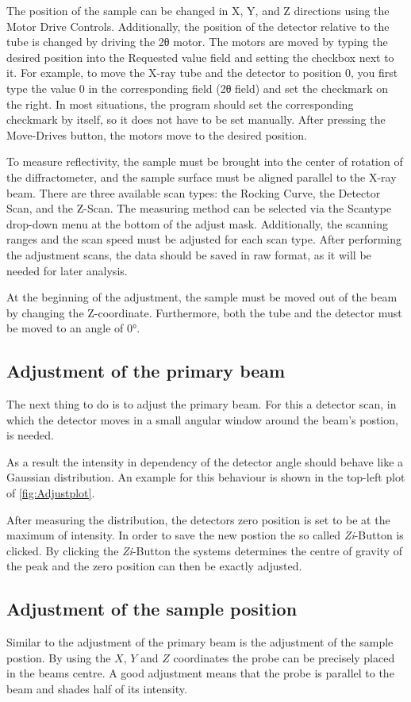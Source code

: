 The position of the sample can be changed in X, Y, and Z directions using the Motor Drive Controls. Additionally, the position of the detector relative to the tube is changed by driving the 2θ motor. The motors are moved by typing the desired position into the Requested value field and setting the checkbox next to it. For example, to move the X-ray tube and the detector to position 0, you first type the value 0 in the corresponding field (2θ field) and set the checkmark on the right. In most situations, the program should set the corresponding checkmark by itself, so it does not have to be set manually. After pressing the Move-Drives button, the motors move to the desired position.

To measure reflectivity, the sample must be brought into the center of rotation of the diffractometer, and the sample surface must be aligned parallel to the X-ray beam. There are three available scan types: the Rocking Curve, the Detector Scan, and the Z-Scan. The measuring method can be selected via the Scantype drop-down menu at the bottom of the adjust mask. Additionally, the scanning ranges and the scan speed must be adjusted for each scan type. After performing the adjustment scans, the data should be saved in raw format, as it will be needed for later analysis.

At the beginning of the adjustment, the sample must be moved out of the beam by changing the Z-coordinate. Furthermore, both the tube and the detector must be moved to an angle of 0°.

\subsection{Adjustment of the primary beam}
The next thing to do is to adjust the primary beam. For this a detector scan, in which the detector moves in a small angular window around the beam's postion, is needed. 

As a result the intensity in dependency of the detector angle should behave like a Gaussian distribution. An example for this behaviour is shown in the top-left plot of \autoref{fig:Adjustplot}.

After measuring the distribution, the detectors zero position is set to be at the maximum of intensity. In order to save the new postion the so called \textit{Zi}-Button is clicked. By clicking the \textit{Zi}-Button the systems determines the centre of gravity of the peak and the zero position can then be exactly adjusted.
 
\subsection{Adjustment of the sample position}
Similar to the adjustment of the primary beam is the adjustment of the sample postion. By using the $X$, $Y$ and $Z$ coordinates the probe can be precisely placed in the beams centre. A good adjustment means that the probe is parallel to the beam and shades half of its intensity. 

